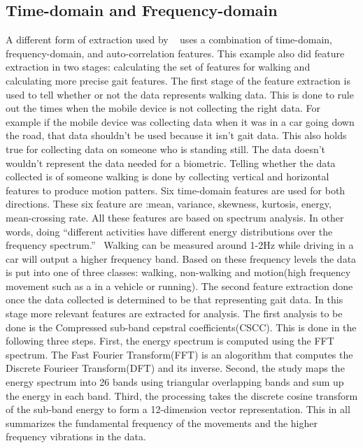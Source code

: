 \documentclass{sig-alternate}
\begin{document}
\subsection{Time-domain and Frequency-domain}
	A different form of extraction used by ~\cite{Lu:2014} uses a combination of time-domain, frequency-domain, and auto-correlation features. 
This example also did feature extraction in two stages: calculating the set of features for walking and calculating more precise gait features. 
The first stage of the feature extraction is used to tell whether or not the data represents walking data. This is done to rule out the times when the mobile device is not collecting the right data. For example if the mobile device was collecting data when it was in a car going down the road, that data shouldn't be used because it isn't gait data. This also holds true for collecting data on someone who is standing still. The data doesn't wouldn't represent the data needed for a biometric. Telling whether the data collected is of someone walking is done by collecting vertical and horizontal features to produce motion patters. Six time-domain features are used for both directions. These six feature are :mean, variance, skewness, kurtosis, energy, mean-crossing rate. All these features are based on spectrum analysis. In other words, doing ``different activities have different energy distributions over the frequency spectrum.''~\cite{Lu:2014} Walking can be measured around 1-2Hz while driving in a car will output a higher frequency band. Based on these frequency levels the data is put into one of three classes: walking, non-walking and motion(high frequency movement such as a in a vehicle or running).
The second feature extraction done once the data collected is determined to be that representing gait data. In this stage more relevant features are extracted for analysis. The first analysis to be done is the Compressed sub-band cepstral coefficients(CSCC). This is done in the following three steps. First, the energy spectrum is computed using the FFT spectrum. The Fast Fourier Transform(FFT) is an alogorithm that computes the Discrete Fourieer Transform(DFT) and its inverse. 
Second, the study maps the energy spectrum into 26 bands using triangular overlapping bands and sum up the energy in each band. Third, the processing takes the discrete cosine transform of the sub-band energy to form a 12-dimension vector representation. This in all summarizes the fundamental frequency of the movements and the higher frequency vibrations in the data.
\end{document}
